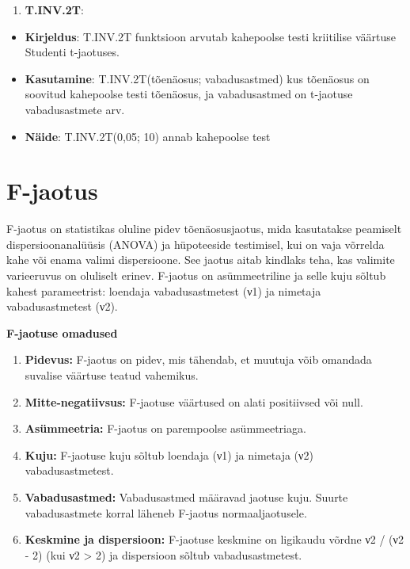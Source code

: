 \documentclass[
]{book}
\providecommand{\tightlist}{%
  \setlength{\itemsep}{0pt}\setlength{\parskip}{0pt}}
\begin{document}
\begin{enumerate}
\def\labelenumi{\arabic{enumi}.}
\setcounter{enumi}{4}
\tightlist
\item
  \textbf{T.INV.2T}:
\end{enumerate}

\begin{itemize}
\tightlist
\item
  \textbf{Kirjeldus}: T.INV.2T funktsioon arvutab kahepoolse testi kriitilise väärtuse Studenti t-jaotuses.
\item
  \textbf{Kasutamine}: T.INV.2T(tõenäosus; vabadusastmed) kus tõenäosus on soovitud kahepoolse testi tõenäosus, ja vabadusastmed on t-jaotuse vabadusastmete arv.
\item
  \textbf{Näide}: T.INV.2T(0,05; 10) annab kahepoolse test
\end{itemize}

\section{F-jaotus}\label{f-jaotus}

F-jaotus on statistikas oluline pidev tõenäosusjaotus, mida kasutatakse peamiselt dispersioonanalüüsis (ANOVA) ja hüpoteeside testimisel, kui on vaja võrrelda kahe või enama valimi dispersioone. See jaotus aitab kindlaks teha, kas valimite varieeruvus on oluliselt erinev. F-jaotus on asümmeetriline ja selle kuju sõltub kahest parameetrist: loendaja vabadusastmetest (ν1) ja nimetaja vabadusastmetest (ν2).

\textbf{F-jaotuse omadused}

\begin{enumerate}
\def\labelenumi{\arabic{enumi}.}
\tightlist
\item
  \textbf{Pidevus:} F-jaotus on pidev, mis tähendab, et muutuja võib omandada suvalise väärtuse teatud vahemikus.
\item
  \textbf{Mitte-negatiivsus:} F-jaotuse väärtused on alati positiivsed või null.
\item
  \textbf{Asümmeetria:} F-jaotus on parempoolse asümmeetriaga.
\item
  \textbf{Kuju:} F-jaotuse kuju sõltub loendaja (ν1) ja nimetaja (ν2) vabadusastmetest.
\item
  \textbf{Vabadusastmed:} Vabadusastmed määravad jaotuse kuju. Suurte vabadusastmete korral läheneb F-jaotus normaaljaotusele.
\item
  \textbf{Keskmine ja dispersioon:} F-jaotuse keskmine on ligikaudu võrdne ν2 / (ν2 - 2) (kui ν2 \textgreater{} 2) ja dispersioon sõltub vabadusastmetest.
\end{enumerate}
\end{document}
